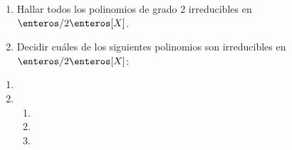 \begin{enunciado}{\ejercicio}
  \begin{enumerate}[label=\roman*)]
    \item Hallar todos los polinomios de grado 2 irreducibles en $\enteros/2\enteros[X]$.
    \item Decidir cuáles de los siguientes polinomios son irreducibles en $\enteros/2\enteros[X]$:
          \begin{enumerate}[label=(\alph*)]
          \end{enumerate}
  \end{enumerate}
\end{enunciado}

\begin{enumerate}[label=\roman*)]
  \item \hacer
  \item
        \begin{enumerate}[label=(\alph*)]
          \item \hacer
          \item \hacer
          \item \hacer
        \end{enumerate}
\end{enumerate}

